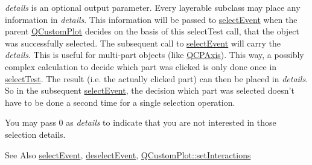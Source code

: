 {\itshape details} is an optional output parameter. Every layerable subclass may place any information in {\itshape details}. This information will be passed to \hyperlink{class_q_c_p_layerable_a7498c2d0d081cf7cad0fb3bb93aa0e91}{select\-Event} when the parent \hyperlink{class_q_custom_plot}{Q\-Custom\-Plot} decides on the basis of this select\-Test call, that the object was successfully selected. The subsequent call to \hyperlink{class_q_c_p_layerable_a7498c2d0d081cf7cad0fb3bb93aa0e91}{select\-Event} will carry the {\itshape details}. This is useful for multi-\/part objects (like \hyperlink{class_q_c_p_axis}{Q\-C\-P\-Axis}). This way, a possibly complex calculation to decide which part was clicked is only done once in \hyperlink{class_q_c_p_layerable_a4001c4d0dfec55598efa4d531f2179a9}{select\-Test}. The result (i.\-e. the actually clicked part) can then be placed in {\itshape details}. So in the subsequent \hyperlink{class_q_c_p_layerable_a7498c2d0d081cf7cad0fb3bb93aa0e91}{select\-Event}, the decision which part was selected doesn't have to be done a second time for a single selection operation.

You may pass 0 as {\itshape details} to indicate that you are not interested in those selection details.

\begin{DoxySeeAlso}{See Also}
\hyperlink{class_q_c_p_layerable_a7498c2d0d081cf7cad0fb3bb93aa0e91}{select\-Event}, \hyperlink{class_q_c_p_layerable_ae546370644a5551c76af739afc008bee}{deselect\-Event}, \hyperlink{class_q_custom_plot_a5ee1e2f6ae27419deca53e75907c27e5}{Q\-Custom\-Plot\-::set\-Interactions} 
\end{DoxySeeAlso}


